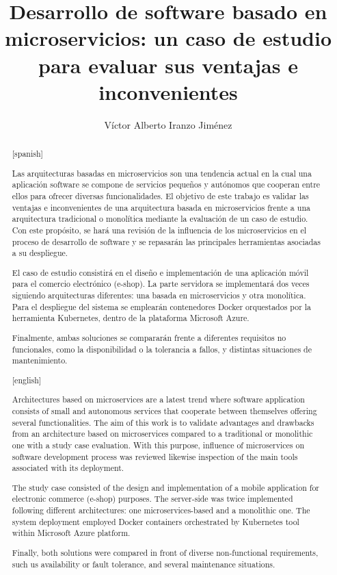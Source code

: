 \documentclass[11pt,spanish,listoffigures]{tfgetsinf}
\title{ Desarrollo de software basado en microservicios: un caso de estudio para evaluar sus ventajas e inconvenientes }
\author{Víctor Alberto Iranzo Jiménez}
\begin{document}

\begin{abstract}[spanish]

Las arquitecturas basadas en microservicios son una tendencia actual en la cual una aplicación software se compone de servicios pequeños y autónomos que cooperan entre ellos para ofrecer diversas funcionalidades.  El objetivo de este trabajo es validar las ventajas e inconvenientes de una arquitectura basada en microservicios frente a una arquitectura tradicional o monolítica mediante la evaluación de un caso de estudio. Con este propósito, se hará una revisión de la influencia de los microservicios en el proceso de desarrollo de software y se repasarán las principales herramientas asociadas a su despliegue.

El caso de estudio consistirá en el diseño e implementación de una aplicación móvil para el comercio electrónico (e-shop). La parte servidora se implementará dos veces siguiendo arquitecturas diferentes: una basada en microservicios y otra monolítica. Para el despliegue del sistema se emplearán contenedores Docker orquestados por la herramienta Kubernetes, dentro de la plataforma Microsoft Azure.

Finalmente, ambas soluciones se compararán frente a diferentes requisitos no funcionales, como la disponibilidad o la tolerancia a fallos, y distintas situaciones de mantenimiento. 

\end{abstract}

\begin{abstract}[english]

Architectures based on microservices are a latest trend where software application consists of small and autonomous services that cooperate between themselves offering several functionalities. The aim of this work is to validate advantages and drawbacks from an architecture based on microservices compared to a traditional or monolithic one with a study case evaluation. With this purpose, influence of microservices on software development process was reviewed likewise inspection of the main tools associated with its deployment.

The study case consisted of the design and implementation of a mobile application for electronic commerce (e-shop) purposes. The server-side was twice implemented following different architectures: one microservices-based and a monolithic one. The system deployment employed Docker containers orchestrated by Kubernetes tool within Microsoft Azure platform.

Finally, both solutions were compared in front of diverse non-functional requirements, such us availability or fault tolerance, and several maintenance situations.

\end{abstract}
\end{document}
